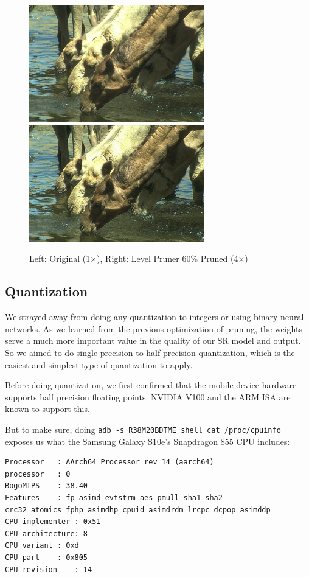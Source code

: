 \documentclass{article}
\begin{document}
\begin{figure}
	\centerline{\includegraphics[width=3in]{../final/figures/camel_original.jpg}\includegraphics[width=3in]{../final/figures/camel_level_60.jpg}}
	\caption{Left: Original (1$\times$), Right: Level Pruner 60\% Pruned (4$\times$)}
	\label{fig:final-pruned}
\end{figure}



\subsection{Quantization}
We strayed away from doing any quantization to integers or using binary neural networks. As we learned from the previous optimization of pruning, the weights serve a much more important value in the quality of our SR model and output. So we aimed to do single precision to half precision quantization, which is the easiest and simplest type of quantization to apply.

Before doing quantization, we first confirmed that the mobile device hardware supports half precision floating points. NVIDIA V100 and the ARM ISA are known to support this.

But to make sure, doing \verb|adb -s R38M20BDTME shell cat /proc/cpuinfo| exposes us what the Samsung Galaxy S10e's Snapdragon 855 CPU includes:
\begin{verbatim}
Processor	: AArch64 Processor rev 14 (aarch64)
processor	: 0
BogoMIPS	: 38.40
Features	: fp asimd evtstrm aes pmull sha1 sha2 
crc32 atomics fphp asimdhp cpuid asimdrdm lrcpc dcpop asimddp
CPU implementer	: 0x51
CPU architecture: 8
CPU variant	: 0xd
CPU part	: 0x805
CPU revision	: 14
\end{verbatim}
\end{document}
